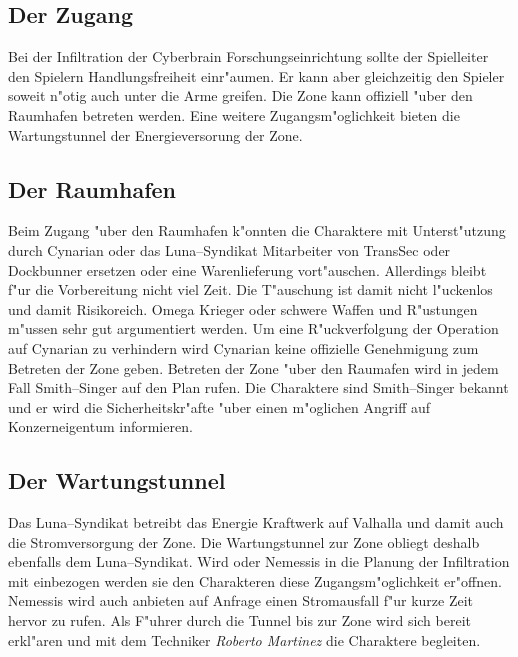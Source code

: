 \subsection{Der Zugang} 
Bei der Infiltration der Cyberbrain Forschungseinrichtung sollte der Spielleiter den Spielern Handlungsfreiheit einr"aumen. Er kann aber gleichzeitig den Spieler soweit n"otig auch unter die Arme greifen. Die Zone kann offiziell "uber den Raumhafen betreten werden. Eine weitere Zugangsm"oglichkeit bieten die Wartungstunnel der Energieversorung der Zone.

\subsection{Der Raumhafen} 
Beim Zugang "uber den Raumhafen k"onnten die Charaktere mit Unterst"utzung durch Cynarian oder das Luna--Syndikat Mitarbeiter von TransSec oder Dockbunner ersetzen oder eine Warenlieferung vort"auschen. Allerdings bleibt f"ur die Vorbereitung nicht viel Zeit. Die T"auschung ist damit nicht l"uckenlos und damit Risikoreich. Omega Krieger oder schwere Waffen und R"ustungen m"ussen sehr gut argumentiert werden. Um eine R"uckverfolgung der Operation auf Cynarian zu verhindern wird Cynarian keine offizielle Genehmigung zum Betreten der Zone geben. Betreten der Zone "uber den Raumafen wird in jedem Fall Smith--Singer auf den Plan rufen. Die Charaktere sind Smith--Singer bekannt und er wird die Sicherheitskr"afte "uber einen m"oglichen Angriff auf Konzerneigentum informieren. 

\subsection{Der Wartungstunnel} 
Das Luna--Syndikat betreibt das Energie Kraftwerk auf Valhalla und damit auch die Stromversorgung der Zone. Die Wartungstunnel zur Zone obliegt deshalb ebenfalls dem Luna--Syndikat. Wird \xl{} oder Nemessis in die Planung der Infiltration mit einbezogen werden sie den Charakteren diese Zugangsm"oglichkeit er"offnen. Nemessis wird auch anbieten auf Anfrage einen Stromausfall f"ur kurze Zeit hervor zu rufen. Als F"uhrer durch die Tunnel bis zur Zone wird sich \xl{} bereit erkl"aren und mit dem Techniker \emph{Roberto Martinez} die Charaktere begleiten.

